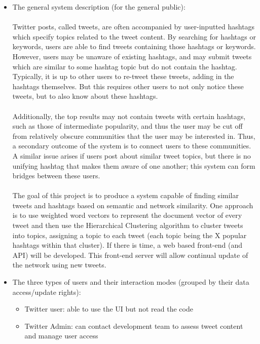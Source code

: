 \documentclass[10pt]{article}
\begin{document}
\begin{itemize} 
\item{The general system description (for the general public): } 
\\\\
Twitter posts, called tweets, are often accompanied by user-inputted hashtags which specify topics related to the tweet content. By searching for hashtags or keywords, users are able to find tweets containing those hashtags or keywords. However, users may be unaware of existing hashtags, and may submit tweets which are similar to some hashtag topic but do not contain the hashtag. Typically, it is up to other users to re-tweet these tweets, adding in the hashtags themselves. But this requires other users to not only notice these tweets, but to also know about these hashtags. 
\\\\
Additionally, the top results may not contain tweets with certain hashtags, such as those of intermediate popularity, and thus the user may be cut off from relatively obscure communities that the user may be interested in. Thus, a secondary outcome of the system is to connect users to these communities. A similar issue arises if users post about similar tweet topics, but there is no unifying hashtag that makes them aware of one another; this system can form bridges between these users.
\\\\
The goal of this project is to produce a system capable of finding similar tweets and hashtags based on semantic and network similarity. One approach is to use weighted word vectors to represent the document vector of every tweet and then use the Hierarchical Clustering algorithm to cluster tweets into topics, assigning a topic to each tweet (each topic being the X popular hashtags within that cluster). If there is time, a web based front-end (and API) will be developed. This front-end server will allow continual update of the network using new tweets. 
\\
\item{The three types of users and their interaction modes (grouped by their data access/update rights): }
\begin{itemize} 
\item{Twitter user: able to use the UI but not read the code} 

\item{Twitter Admin: can contact development team to assess tweet content and manage user access}


\end{itemize}
\end{itemize}
\end{document}
